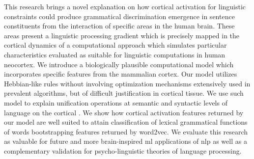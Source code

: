 {This research brings a novel explanation on how cortical activation for linguistic constraints could produce grammatical discrimination emergence in sentence constituents from the interaction of specific areas in the human brain. These areas present a linguistic processing gradient which is precisely mapped in the cortical dynamics of a computational approach which simulates particular characteristics evaluated as suitable for linguistic computations in human neocortex.
We introduce a biologically plausible computational model which incorporates specific features from the mammalian cortex. Our model utilizes Hebbian-like rules without involving optimization mechanisms extensively used in prevalent  algorithms, but of difficult justification in cortical tissue.
We use such model to explain unification operations at semantic and syntactic levels of language on the cortical .
We show how cortical  activation features returned by our model are well suited to attain classification of lexical grammatical functions of words bootstrapping  features returned by word2vec.
We evaluate this research as valuable for future and more brain-inspired \gls{ml} applications of \gls{nlp} as well as a complementary validation for psycho-linguistic theories of language processing. 
}






